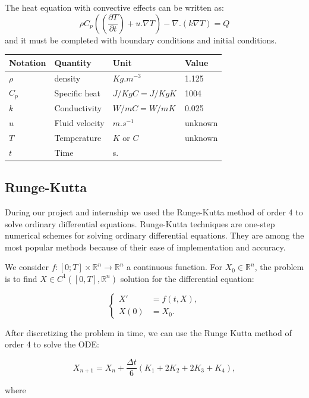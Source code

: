 \documentclass[12pt]{article}
\begin{document}
	\noindent The heat equation with convective effects can be written as:
    $$\rho C_p((\frac{\partial T}{\partial t})+u . \nabla T)-\nabla .(k \nabla T)=Q$$
    and it must be completed  with boundary conditions and initial conditions.
    \newline
	\renewcommand{\arraystretch}{2}
    \begin{tabular}{|R{3cm}|C{3cm}|L{3cm}|L{3cm}|}
    \hline
    Notation & Quantity &Unit & Value   \\
    \hline
    $\rho$ & density & $Kg.m^
    {-3}$ & 1.125  \\[4cm]
    \hline
    $C_p$ & Specific heat & $J/KgC=J/KgK$ & 1004 \\[4cm]
    \hline
    $k$ & Conductivity & $W/mC=W/mK$ & 0.025 \\[4cm]
    \hline
    $u$ & Fluid velocity & $m.s^{-1}$  & unknown \\[4cm]
    \hline
    $T$ & Temperature & $K$ or $C$  & unknown \\[4cm]
    \hline
    $t$ & Time & s. &   \\[4cm]
    \hline
\end{tabular}

    \subsection{Runge-Kutta}
    \noindent During our project and internship we used the Runge-Kutta method of order 4 to solve ordinary differential equations. Runge-Kutta techniques are one-step numerical schemes for solving ordinary differential equations. They are among the most popular methods because of their ease of implementation and accuracy.
    
    \noindent We consider $f : [0; T] \times \mathbb{R}^n \rightarrow \mathbb{R}^n$ a continuous function. For $X_0\in \mathbb{R}^n$, the problem is to find  $X\in C^1([0,T],\mathbb{R}^n)$ solution for the differential equation:
	
	$$\left\{\begin{aligned}
		X'&=f(t,X), \\
		X(0)&=X_0.
	\end{aligned}\right.$$
	
	
	 \noindent After discretizing the problem in time, we can use the Runge Kutta method of order 4 to solve the ODE:
		
		$$X_{n+1}=X_n+\frac{\Delta t}{6}\left(K_1+2K_2+2K_3+K_4\right) ,$$
		
		\noindent where 
		
\end{document}
